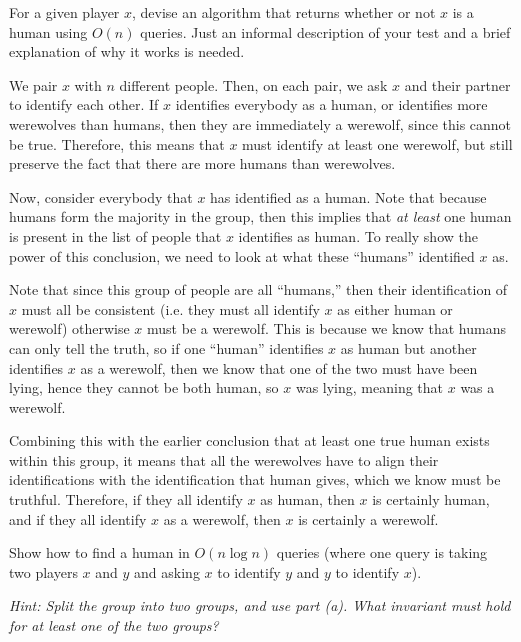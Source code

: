 \documentclass[11pt]{article}
\begin{document}
\begin{subparts}
	\subpart For a given player $x$, devise an algorithm that returns whether or not $x$ is a human using $O(n)$ queries. Just an informal description of your test and a brief explanation of why it works is needed.

	\begin{solution}
		We pair $x$ with $n$ different people. Then, on each pair, we ask $x$ and their partner to identify 
		each other. 
		If $x$ identifies everybody as a human, or identifies more werewolves than humans, then they are 
		immediately a werewolf, since this cannot be true. Therefore, this means that $x$ must identify 
		at least one werewolf, but still preserve the fact that there are more humans than werewolves.

		Now, consider everybody that $x$ has identified as a human. Note that because humans form the majority 
		in the group, then this implies that \textit{at least} one human is present in the list of people that
		$x$ identifies as human. To really show the power of this conclusion, we need to look at what these 
		``humans'' identified $x$ as. 

		Note that since this group of people are all ``humans,'' then their identification of $x$ must all 
		be consistent (i.e. they must all identify $x$ as either human or werewolf) otherwise $x$ must be a werewolf.
		This is because we know that humans can only tell the truth, so if one ``human''
		identifies $x$ as human but another identifies $x$ as a werewolf, then we know that one of the two 
		must have been lying, hence they cannot be both human, so $x$ was lying, meaning that $x$ was a werewolf.
		
		Combining this with the earlier conclusion that at least one true human exists within this group, 
		it means that all the werewolves have to align their identifications with the identification that 
		human gives, which we know must be truthful. Therefore, if they all identify $x$ as human,
		then $x$ is certainly human, and if they 
		all identify $x$ as a werewolf, then $x$ is certainly a werewolf. 
	\end{solution}
	
	\subpart Show how to find a human in $O(n\log n)$ queries (where one query is taking two players $x$ and $y$ and asking $x$ to identify $y$ and $y$ to identify $x$).
	
	\textit{Hint: Split the group into two groups, and use part (a). What invariant must hold for at least one of the two groups?}


\end{subparts}
\end{document}
